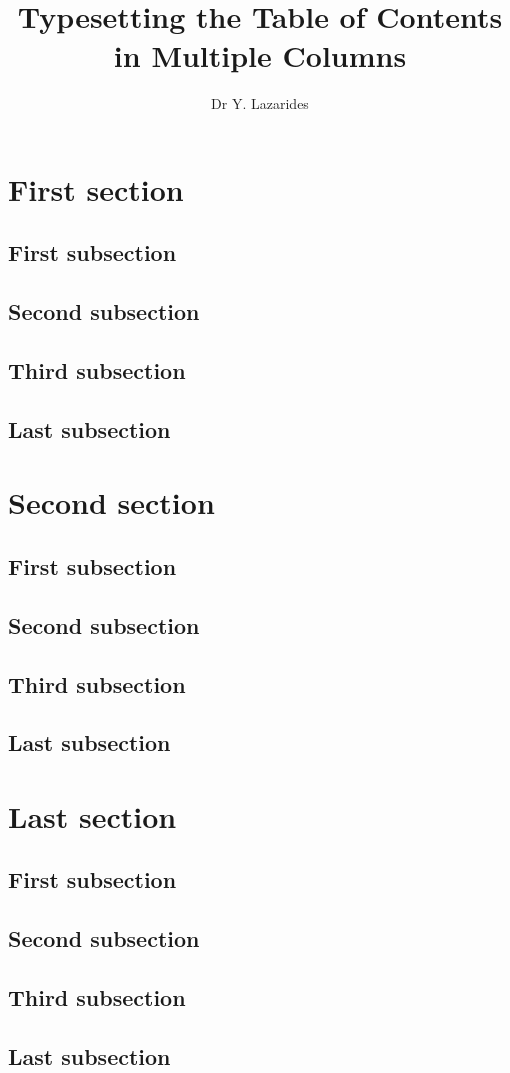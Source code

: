\documentclass{article}
\title{Typesetting the Table of Contents in Multiple Columns}
\author{Dr Y. Lazarides}
\begin{document}
\maketitle
\tableofcontents
\section{First section}
\begin{multicols}{3}
\lipsum[1-2]
\end{multicols}
\subsection{First subsection}
\subsection{Second subsection}
\subsection{Third subsection}
\subsection{Last subsection}
\section{Second section}
\subsection{First subsection}
\subsection{Second subsection}
\subsection{Third subsection}
\subsection{Last subsection}
\section{Last section}
\subsection{First subsection}
\subsection{Second subsection}
\subsection{Third subsection}
\subsection{Last subsection}
\end{document}
